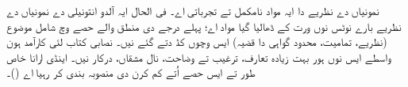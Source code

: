 \documentclass[../../include/open-logic-part]{subfiles}
\begin{document}

\begin{editorial}
  نمونیاں دے نظریے دا ایہ مواد نامکمل تے تجرباتی اے۔ فی الحال ایہ
  آلدو انتونیلی دے نمونیاں دے نظریے بارے نوٹس نوں ورت کے ڈھالیا گیا مواد اے؛
  پہلے درجے دی منطق والے حصے وچ شامل موضوع (نظریے، تمامیت، محدود
  گواہی دا قضیہ) ایس وچوں کڈ دتے گئے نیں۔ نصابی کتاب لئی کارآمد
  ہون واسطے ایس نوں ہور بہت زیادہ تعارف، ترغیب تے وضاحت، نال مشقاں،
  درکار نیں۔ اینڈی ارانا خاص طور تے ایس حصے اُتے کم کرن دی
  منصوبہ بندی کر رہیا اے ()۔
\end{editorial}





\OLEndPartHook
\end{document}

